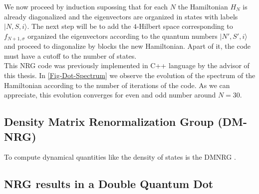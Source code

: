 We now proceed by induction supossing that for each $N$ the Hamiltonian $H_{N}$ is already diagonalized and the eigenvectors are organized in states with labels $\vert N,S,i\rangle.$ The next step will be to add the $4$-Hilbert space corresponding to $f_{N+1,\sigma}$ organized the eigenvectors according to the quantum numbers $\vert N',S',i\rangle$ and proceed to diagonalize by blocks the new Hamiltonian. Apart of it, the code must have a cutoff to the number of states. \\

This NRG code was previously implemented in C++ language by the advisor of this thesis. In \ref{Fig-Dot-Spectrum} we observe the evolution of the spectrum of the Hamiltonian according to the number of iterations of the code. As we can appreciate, this evolution converges for even and odd number around $N=30$.  \\



\subsection{Density Matrix Renormalization Group (DM-NRG)}
To compute  dynamical quantities \cite{costi_transport_1994} like the density of states  is the DMNRG \cite{hofstetter_generalized_2000}. 




\subsection{NRG results in a Double Quantum Dot \label{sec: NRG-DQD}}

